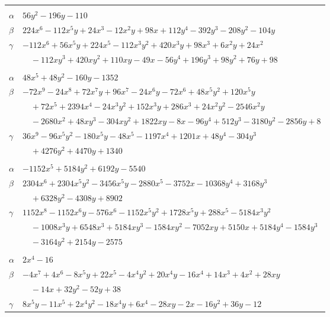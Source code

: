 \documentclass[11pt]{article}
\begin{document}
\begin{longtable}{@{}ll@{}}
\addlinespace[3pt]
\multicolumn{2}{@{}l}{$\{i,j\}=\{20,37\}$, $k_{ij}=2\cdot 5\cdot 11$}\\
$\alpha$ & $56y^{2}-196y-110$\\
$\beta$ & $224x^{6}-112x^{5}y+24x^{3}-12x^{2}y+98x+112y^{4}-392y^{3}-208y^{2}-104y$\\
$\gamma$ & $-112x^{6}+56x^{5}y+224x^{5}-112x^{3}y^{2}+420x^{3}y+98x^{3}+6x^{2}y+24x^{2}$\\
 & $\quad -112xy^{3}+420xy^{2}+110xy-49x-56y^{4}+196y^{3}+98y^{2}+76y+98$\\
\addlinespace[3pt]
\multicolumn{2}{@{}l}{$\{i,j\}=\{21,25\}$, $k_{ij}=2^{4}\cdot 5\cdot 17$}\\
$\alpha$ & $48x^{5}+48y^{2}-160y-1352$\\
$\beta$ & $-72x^{9}-24x^{8}+72x^{7}y+96x^{7}-24x^{6}y-72x^{6}+48x^{5}y^{2}+120x^{5}y$\\
 & $\quad +72x^{5}+2394x^{4}-24x^{3}y^{2}+152x^{3}y+286x^{3}+24x^{2}y^{2}-2546x^{2}y$\\
 & $\quad -2680x^{2}+48xy^{3}-304xy^{2}+1822xy-8x-96y^{4}+512y^{3}-3180y^{2}-2856y+8$\\
$\gamma$ & $36x^{9}-96x^{5}y^{2}-180x^{5}y-48x^{5}-1197x^{4}+1201x+48y^{4}-304y^{3}$\\
 & $\quad +4276y^{2}+4470y+1340$\\
\addlinespace[3pt]
\multicolumn{2}{@{}l}{$\{i,j\}=\{21,26\}$, $k_{ij}=7\cdot 11\cdot 13\cdot 17$}\\
$\alpha$ & $-1152x^{5}+5184y^{2}+6192y-5540$\\
$\beta$ & $2304x^{6}+2304x^{5}y^{2}-3456x^{5}y-2880x^{5}-3752x-10368y^{4}+3168y^{3}$\\
 & $\quad +6328y^{2}-4308y+8902$\\
$\gamma$ & $1152x^{8}-1152x^{6}y-576x^{6}-1152x^{5}y^{2}+1728x^{5}y+288x^{5}-5184x^{3}y^{2}$\\
 & $\quad -1008x^{3}y+6548x^{3}+5184xy^{3}-1584xy^{2}-7052xy+5150x+5184y^{4}-1584y^{3}$\\
 & $\quad -3164y^{2}+2154y-2575$\\
\addlinespace[3pt]
\multicolumn{2}{@{}l}{$\{i,j\}=\{21,27\}$, $k_{ij}=2\cdot 3^{3}$}\\
$\alpha$ & $2x^{4}-16$\\
$\beta$ & $-4x^{7}+4x^{6}-8x^{5}y+22x^{5}-4x^{4}y^{2}+20x^{4}y-16x^{4}+14x^{3}+4x^{2}+28xy$\\
 & $\quad -14x+32y^{2}-52y+38$\\
$\gamma$ & $8x^{5}y-11x^{5}+2x^{4}y^{2}-18x^{4}y+6x^{4}-28xy-2x-16y^{2}+36y-12$\\

\end{longtable}
\end{document}
